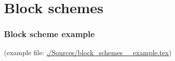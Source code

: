 \section{Block schemes}
\label{sec:block_schemes}



\begin{frame}
	\frametitle{Block scheme example}
	(example file: \url{./Sources/block_schemes__example.tex})
	
\end{frame}

